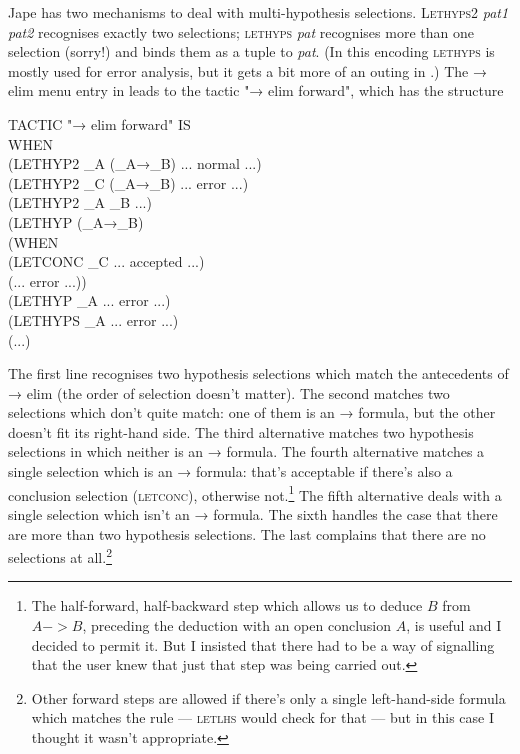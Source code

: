 Jape has two mechanisms to deal with multi-hypothesis selections. \textsc{Lethyps2} \textit{pat1} \textit{pat2} recognises exactly two selections; \textsc{lethyps} \textit{pat} recognises more than one selection (sorry!) and binds them as a tuple to \textit{pat}. (In this encoding \textsc{lethyps} is mostly used for error analysis, but it gets a bit more of an outing in .) The → elim menu entry in  leads to the tactic
"→ elim forward", which has the structure
\begin{japeish}
TACTIC "→ elim forward" IS \\
\tab WHEN \\
\tab \tab (LETHYP2 \_A (\_A→\_B) ... normal ...) \\
\tab \tab (LETHYP2 \_C (\_A→\_B) ... error ...) \\
\tab \tab (LETHYP2 \_A \_B ...) \\
\tab \tab (LETHYP (\_A→\_B) \\
\tab \tab \tab (WHEN  \\
\tab \tab \tab \tab (LETCONC \_C ... accepted ...) \\
\tab \tab \tab \tab (... error ...))\\
\tab \tab (LETHYP \_A ... error ...)\\
\tab \tab (LETHYPS \_A ... error ...)\\
\tab \tab (...)
\end{japeish}
The first line recognises two hypothesis selections which match the antecedents of → elim (the order of selection doesn't matter). The second matches two selections which don't quite match: one of them is an → formula, but the other doesn't fit its right-hand side. The third alternative matches two hypothesis selections in which neither is an → formula. The fourth alternative matches a single selection which is an → formula: that's acceptable if there's also a conclusion selection (\textsc{letconc}), otherwise not.\footnote{The half-forward, half-backward step which allows us to deduce $B$ from $A->B$, preceding the deduction with an open conclusion $A$, is useful and I decided to permit it. But I insisted that there had to be a way of signalling that the user knew that just that step was being carried out.} The fifth alternative deals with a single selection which isn't an → formula. The sixth handles the case that there are more than two hypothesis selections. The last complains that there are no selections at all.\footnote{Other forward steps are allowed if there's only a single left-hand-side formula which matches the rule --- \textsc{letlhs} would check for that --- but in this case I thought it wasn't appropriate.}


